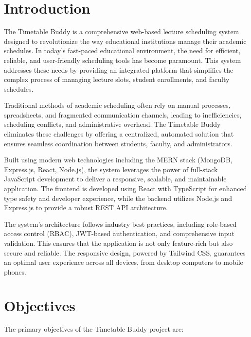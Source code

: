 \documentclass[12pt,a4paper]{report}
\begin{document}
\section{Introduction}
The Timetable Buddy is a comprehensive web-based lecture scheduling system designed to revolutionize the way educational institutions manage their academic schedules. In today's fast-paced educational environment, the need for efficient, reliable, and user-friendly scheduling tools has become paramount. This system addresses these needs by providing an integrated platform that simplifies the complex process of managing lecture slots, student enrollments, and faculty schedules.

Traditional methods of academic scheduling often rely on manual processes, spreadsheets, and fragmented communication channels, leading to inefficiencies, scheduling conflicts, and administrative overhead. The Timetable Buddy eliminates these challenges by offering a centralized, automated solution that ensures seamless coordination between students, faculty, and administrators.

Built using modern web technologies including the MERN stack (MongoDB, Express.js, React, Node.js), the system leverages the power of full-stack JavaScript development to deliver a responsive, scalable, and maintainable application. The frontend is developed using React with TypeScript for enhanced type safety and developer experience, while the backend utilizes Node.js and Express.js to provide a robust REST API architecture.

The system's architecture follows industry best practices, including role-based access control (RBAC), JWT-based authentication, and comprehensive input validation. This ensures that the application is not only feature-rich but also secure and reliable. The responsive design, powered by Tailwind CSS, guarantees an optimal user experience across all devices, from desktop computers to mobile phones.

\section{Objectives}
The primary objectives of the Timetable Buddy project are:
\end{document}
